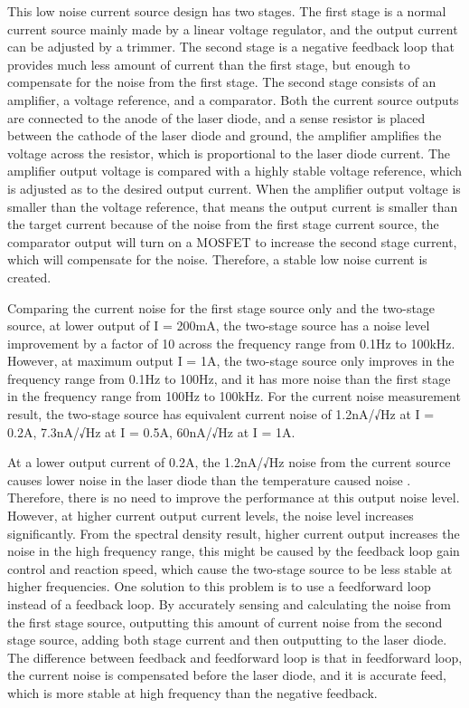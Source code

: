 This low noise current source design has two stages.  The first stage is a normal current source mainly made by a linear voltage regulator, and the output current can be adjusted by a trimmer.  The second stage is a negative feedback loop that provides much less amount of current than the first stage, but enough to compensate for the noise from the first stage.  The second stage consists of an amplifier, a voltage reference, and a comparator.  Both the current source outputs are connected to the anode of the laser diode, and a sense resistor is placed between the cathode of the laser diode and ground, the amplifier amplifies the voltage across the resistor, which is proportional to the laser diode current.  The amplifier output voltage is compared with a highly stable voltage reference, which is adjusted as to the desired output current.  When the amplifier output voltage is smaller than the voltage reference, that means the output current is smaller than the target current because of the noise from the first stage current source, the comparator output will turn on a MOSFET to increase the second stage current, which will compensate for the noise.  Therefore, a stable low noise current is created.

Comparing the current noise for the first stage source only and the two-stage source, at lower output of I = 200mA, the two-stage source has a noise level improvement by a factor of 10 across the frequency range from 0.1Hz to 100kHz.  However, at maximum output I = 1A, the two-stage source only improves in the frequency range from 0.1Hz to 100Hz, and it has more noise than the first stage in the frequency range from 100Hz to 100kHz.
For the current noise measurement result, the two-stage source has equivalent current noise of 1.2nA/√Hz at I = 0.2A, 7.3nA/√Hz at I = 0.5A, 60nA/√Hz at I = 1A.

At a lower output current of 0.2A, the 1.2nA/√Hz noise from the current source causes lower noise in the laser diode than the temperature caused noise \cite{LinewidthQuantumCascadeLaser}.  Therefore, there is no need to improve the performance at this output noise level.  However, at higher current output current levels, the noise level increases significantly.  From the spectral density result, higher current output increases the noise in the high frequency range, this might be caused by the feedback loop gain control and reaction speed, which cause the two-stage source to be less stable at higher frequencies.  One solution to this problem is to use a feedforward loop instead of a feedback loop.  By accurately sensing and calculating the noise from the first stage source, outputting this amount of current noise from the second stage source, adding both stage current and then outputting to the laser diode.  The difference between feedback and feedforward loop is that in feedforward loop, the current noise is compensated before the laser diode, and it is accurate feed, which is more stable at high frequency than the negative feedback.


